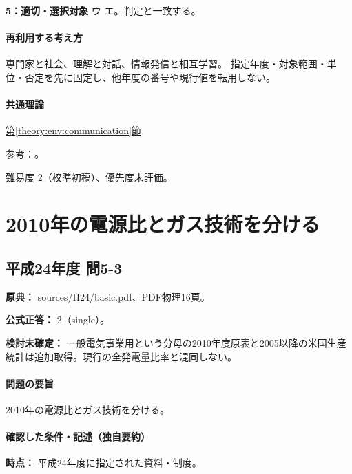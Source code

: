 \noindent\textbf{5：適切・選択対象} ウ エ。判定と一致する。\par

\paragraph{再利用する考え方} 専門家と社会、理解と対話、情報発信と相互学習。 指定年度・対象範囲・単位・否定を先に固定し、他年度の番号や現行値を転用しない。

\paragraph{共通理論} \hyperref[theory:env:communication]{第\ref*{theory:env:communication}節}

\par 参考：\cite{env58_communication}。

\par 難易度 2（校準初稿）、優先度未評価。

\section{2010年の電源比とガス技術を分ける}

\subsection{平成24年度 問5-3}
\label{q:h24-reg-basic-5-3}

\noindent\textbf{原典：} sources/H24/basic.pdf、PDF物理16頁。

\textbf{公式正答：} 2（single）。

\par\textbf{検討未確定：} 一般電気事業用という分母の2010年度原表と2005以降の米国生産統計は追加取得。現行の全発電量比率と混同しない。

\paragraph{問題の要旨} 2010年の電源比とガス技術を分ける。

\paragraph{確認した条件・記述（独自要約）}\mbox{}\par

\noindent\textbf{時点：} 平成24年度に指定された資料・制度。\par

